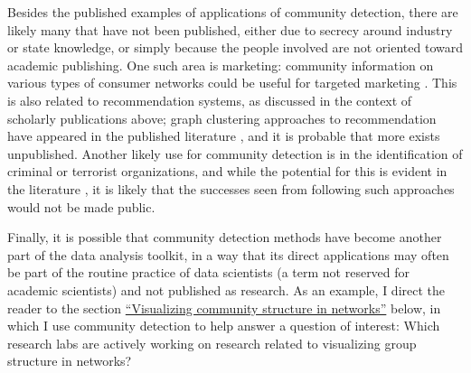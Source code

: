Besides the published examples of applications of community detection,
there are likely many that have not been published, either due to
secrecy around industry or state knowledge, or simply because the people
involved are not oriented toward academic publishing. One such area is
marketing: community information on various types of consumer networks
could be useful for targeted marketing
\autocite{labatut_detection_2012}. This is also related to
recommendation systems, as discussed in the context of scholarly
publications above; graph clustering approaches to recommendation have
appeared in the published literature
\autocites{reddy_graph_2002}{fouss_random-walk_2007}, and it is probable
that more exists unpublished. Another likely use for community detection
is in the identification of criminal or terrorist organizations, and
while the potential for this is evident in the literature
\autocites{krebs_mapping_2002}{nath_crime_2006}{carlos_andre_community_2012}{clauset_developmental_2012}{waskiewicz_friend_2012}{ferrara_detecting_2014},
it is likely that the successes seen from following such approaches
would not be made public.

Finally, it is possible that community detection methods have become
another part of the data analysis toolkit, in a way that its direct
applications may often be part of the routine practice of data
scientists (a term not reserved for academic scientists) and not
published as research. As an example, I direct the reader to the section
\protect\hyperlink{visualization}{``Visualizing community structure in
networks''} below, in which I use community detection to help answer a
question of interest: Which research labs are actively working on
research related to visualizing group structure in networks?
